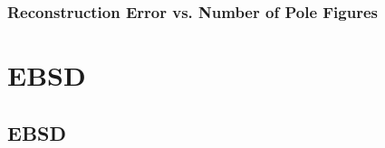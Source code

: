 \documentclass{beamer}
\begin{document}
\begin{frame}
  \frametitle{Reconstruction Error vs. Number of Pole Figures}

  
\end{frame}




\section{EBSD}

\subsection*{EBSD}
\end{document}
